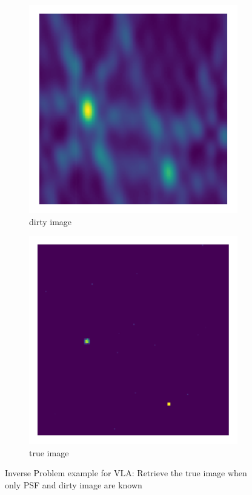 \begin{figure}[h!]
	\begin{subfigure}[b]{0.28\linewidth}
		\includegraphics[width=\linewidth, trim={18px 19px 18px 18px}, clip]{./chapters/01.intro/img/dirty_image.png}
		\caption{dirty image}
	\end{subfigure}
	\begin{subfigure}[b]{0.28\linewidth}
		\includegraphics[width=\linewidth, trim={18px 19px 18px 18px}, clip]{./chapters/01.intro/img/true_image.png}
		\caption{true image}
	\end{subfigure}
	\caption{Inverse Problem example for VLA: Retrieve the true image when only PSF and dirty image are known}
	\label{intro:measurement_problem}
\end{figure}

